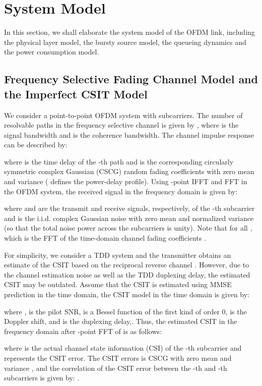 \documentclass[11pt,journal, onecolumn]{./IEEEtran}
\newcommand{\blue}{\color{black}}
\newcommand{\red}{\color{black}}
\begin{document}
\section{System Model}

In this section, we shall elaborate the system model of the OFDM link, including the physical layer model, the bursty source model, the queueing dynamics and the power consumption model.


\subsection{Frequency Selective Fading Channel Model and the Imperfect CSIT Model}

We consider a point-to-point OFDM system with  subcarriers. The number of resolvable paths in the frequency selective channel is given by , where  is the signal bandwidth and  is the coherence bandwidth. The channel impulse response can be described by:

where  is the time delay of the -th path and  is the corresponding circularly symmetric complex Gaussian (CSCG) random fading coefficients with zero mean and {\red variance  ( defines the power-delay profile).} Using -point IFFT and FFT in the OFDM system, the received signal in the frequency domain is given by:

where  and  are the transmit and receive signals, respectively, of the -th subcarrier and  is the i.i.d. complex Gaussian noise with zero mean and normalized variance  (so that the total noise power across the  subcarriers is unity).
Note that  for all , which is the FFT of the time-domain channel fading coefficients .



For simplicity, we consider a TDD system and the transmitter obtains an estimate of the CSIT based on the reciprocal reverse channel \cite{marzetta_fast_2006}. However, due to the channel estimation noise as well as the TDD duplexing delay, the estimated CSIT may be outdated. Assume that the CSIT is estimated using MMSE prediction in the time domain, the CSIT model in the time domain is given by:

{\red  where ,  is the pilot SNR,  is a Bessel function of the first kind of order 0,  is the Doppler shift, and  is the duplexing delay\cite{csi_error_it}},{\blue \cite{Ramyadelayfb2009}}. Thus, the estimated CSIT in the frequency domain  after -point FFT of  is as follows:

where  is the actual channel state information (CSI) of the -th subcarrier and  represents the CSIT error. \red The CSIT errors  is CSCG with zero mean and variance , and the correlation of the CSIT error between the -th and -th subcarriers is given by:
.
\end{document}
